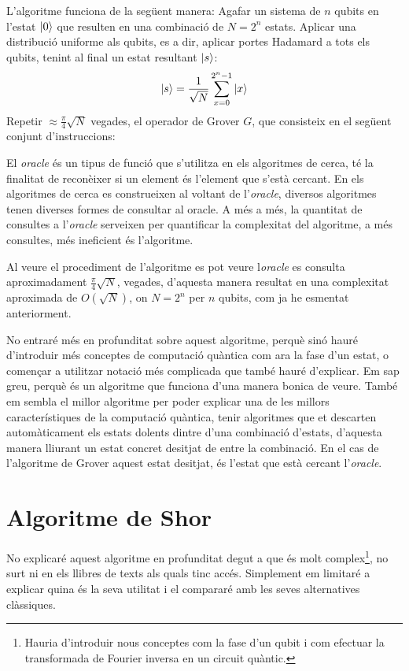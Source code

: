 L'algoritme funciona de la següent manera:
Agafar un sistema de $n$ qubits en l'estat $\ket{0}$ que resulten en una combinació de $N = 2^n$ estats. Aplicar una distribució uniforme als qubits, es a dir, aplicar portes Hadamard a tots els qubits, tenint al final un estat resultant $\ket{s}$:
\begin{equation*}
	\ket{s} = \frac{1}{\sqrt{N}} \sum_{x=0}^{2^n-1} \ket{x}
\end{equation*}
Repetir $\approx \frac{\pi}{4}\sqrt{N}$ vegades, el operador de Grover $G$, que consisteix en el següent conjunt d'instruccions:
\begin{algorithmic}[1]
\end{algorithmic}


El \textit{oracle} és un tipus de funció que s'utilitza en els algoritmes de cerca, té la finalitat de reconèixer si un element és l'element que s'està cercant. En els algoritmes de cerca es construeixen al voltant de l'\textit{oracle}, diversos algoritmes tenen diverses formes de consultar al oracle. A més a més, la quantitat de consultes a l'\textit{oracle} serveixen per quantificar la complexitat del algoritme, a més consultes, més ineficient és l'algoritme. 

Al veure el procediment de l'algoritme es pot veure l\textit{oracle} es consulta aproximadament $\frac{\pi}{4}\sqrt{N}$, vegades, d'aquesta manera resultat en una complexitat aproximada de $O(\sqrt{N})$, on $N=2^{n}$ per $n$ qubits, com ja he esmentat anteriorment. 

No entraré més en profunditat sobre aquest algoritme, perquè sinó hauré d'introduir més conceptes de computació quàntica com ara la fase d'un estat, o començar a utilitzar notació més complicada que també hauré d'explicar. Em sap greu, perquè és un algoritme que funciona d'una manera bonica de veure. També em sembla el millor algoritme per poder explicar una de les millors característiques de la computació quàntica, tenir algoritmes que et descarten automàticament els estats dolents dintre d'una combinació d'estats, d'aquesta manera lliurant un estat concret desitjat de entre la combinació. En el cas de l'algoritme de Grover aquest estat desitjat, és l'estat que està cercant l'\textit{oracle}. 

\section{Algoritme de Shor}
No explicaré aquest algoritme en profunditat degut a que és molt complex\footnote{Hauria d'introduir nous conceptes com la fase d'un qubit i com efectuar la transformada de Fourier inversa en un circuit quàntic.}, no surt ni en els llibres de texts als quals tinc accés. Simplement em limitaré a explicar quina és la seva utilitat i el compararé amb les seves alternatives clàssiques.

